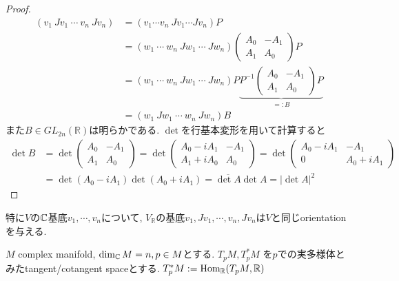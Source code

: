 \begin{proof}
\begin{align*}
(v_{1}\ Jv_{1}\ \cdots\ v_{n}\ Jv_{n})
&=(v_{1}\cdots v_{n}\ Jv_{1}\cdots Jv_{n})P
\\
&=(w_{1}\ \cdots\ w_{n}\ Jw_{1}\ \cdots\ Jw_{n})
\begin{pmatrix}
A_{0} & -A_{1}\\
A_{1} & A_{0}
\end{pmatrix}
P
\\
&=(w_{1}\ \cdots\ w_{n}\ Jw_{1}\ \cdots\ Jw_{n})P
\underbrace{
P^{-1}
\begin{pmatrix}
A_{0} & -A_{1}\\
A_{1} & A_{0}
\end{pmatrix}
P
}_{=:B}
\\
&=(w_{1}\ Jw_{1}\ \cdots\ w_{n}\ Jw_{n})B
\end{align*}
また$B\in GL_{2n}(\mathbb{R})$は明らかである. 
$\det$を行基本変形を用いて計算すると
\begin{align*}
\det B&=\det
\begin{pmatrix}
A_{0} & -A_{1}\\
A_{1} & A_{0}
\end{pmatrix}
=\det
\begin{pmatrix}
A_{0}-iA_{1} & -A_{1}\\
A_{1}+iA_{0} & A_{0}
\end{pmatrix}
=\det
\begin{pmatrix}
A_{0}-iA_{1} & -A_{1}\\
0 & A_{0}+iA_{1}
\end{pmatrix}
\\
&=\det(A_{0}-iA_{1})\det(A_{0}+iA_{1})
=\overline{\det A}\det A=|\det A|^{2}
\end{align*}
\end{proof}
特に$V$の$\mathbb{C}$基底$v_{1},\cdots,v_{n}$について, 
$V_{\mathbb{R}}$の基底$v_{1},Jv_{1},\cdots,v_{n},Jv_{n}$は$V$と同じorientationを与える. 



$M$ complex manifold, $\dim_{\mathbb{C}} M =n, p \in M$とする.
${T}_{p} M, {T}_{p} ^{*}M$ を$p$での実多様体とみたtangent/cotangent spaceとする.
${T}_{p} ^{*}M:=\mathrm{Hom}_{\mathbb{R}} ({T}_{p}M, \mathbb{R})$

